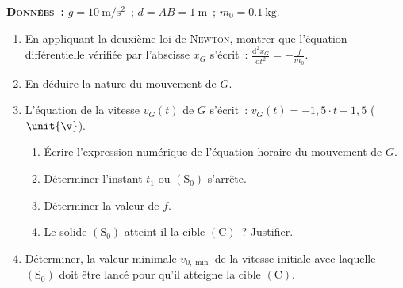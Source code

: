 \textbf{\textsc{Données~:}}
$g=\qty{10}{\m\per\square\s}$~; $d=AB=\qty{1}{\m}$~; $m_{0}=\qty{0.1}{\kg}$.

\begin{enumerate}
    \item En appliquant la deuxième loi de \textsc{Newton}, montrer que
          l'équation différentielle vérifiée par l'abscisse $x_{G}$ s'écrit~:
          $\frac{\mathrm{d}^{2}x_{G}}{\mathrm{d}t^{2}}=-\frac{f}{m_{0}}$.
    \item En déduire la nature du mouvement de $G$.
    \item L'équation de la vitesse $v_{G}(t)$ de $G$ s'écrit~:
          $v_{G}(t)=-1,5\cdot t+1,5$ ($\unit{\v}$).
          \begin{enumerate}
              \item Écrire l'expression numérique de l'équation horaire du
                    mouvement de $G$.
              \item Déterminer l'instant $t_{1}$ ou $\mathrm{(S_{0})}$ s'arrête.
              \item Déterminer la valeur de $f$.
              \item Le solide $\mathrm{(S_{0})}$ atteint-il la cible
                    $\mathrm{(C)}$~? Justifier.
          \end{enumerate}
    \item Déterminer, la valeur minimale $v_{0,\min}$ de la vitesse
          initiale avec laquelle $\mathrm{(S_{0})}$ doit être lancé pour qu'il
          atteigne la cible $\mathrm{(C)}$.
\end{enumerate}

